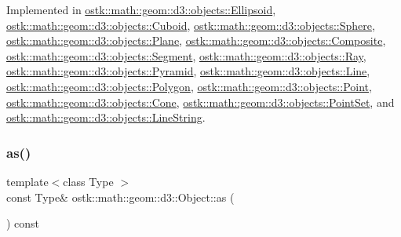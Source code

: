 Implemented in \hyperlink{classostk_1_1math_1_1geom_1_1d3_1_1objects_1_1_ellipsoid_aa7c60b942f6b1fa3a513bc3b549ab9e6}{ostk\+::math\+::geom\+::d3\+::objects\+::\+Ellipsoid}, \hyperlink{classostk_1_1math_1_1geom_1_1d3_1_1objects_1_1_cuboid_aaa90106ccf8120f854bdcf0f824e5610}{ostk\+::math\+::geom\+::d3\+::objects\+::\+Cuboid}, \hyperlink{classostk_1_1math_1_1geom_1_1d3_1_1objects_1_1_sphere_a421357bf4058e68e0aa636f606c6b249}{ostk\+::math\+::geom\+::d3\+::objects\+::\+Sphere}, \hyperlink{classostk_1_1math_1_1geom_1_1d3_1_1objects_1_1_plane_a4d96743e35df811f8c725561d353e245}{ostk\+::math\+::geom\+::d3\+::objects\+::\+Plane}, \hyperlink{classostk_1_1math_1_1geom_1_1d3_1_1objects_1_1_composite_a2d99d6b4096c2f5ba3175f886e2e2c7d}{ostk\+::math\+::geom\+::d3\+::objects\+::\+Composite}, \hyperlink{classostk_1_1math_1_1geom_1_1d3_1_1objects_1_1_segment_a5d2aba754d42c89224c7579944de9c4f}{ostk\+::math\+::geom\+::d3\+::objects\+::\+Segment}, \hyperlink{classostk_1_1math_1_1geom_1_1d3_1_1objects_1_1_ray_abdbc52aa6745f9d9601a8138a519d828}{ostk\+::math\+::geom\+::d3\+::objects\+::\+Ray}, \hyperlink{classostk_1_1math_1_1geom_1_1d3_1_1objects_1_1_pyramid_ab4f31049019c0ea4b87931adf4ba7c5d}{ostk\+::math\+::geom\+::d3\+::objects\+::\+Pyramid}, \hyperlink{classostk_1_1math_1_1geom_1_1d3_1_1objects_1_1_line_ab12eb788b966601d6d09f75196a30d6f}{ostk\+::math\+::geom\+::d3\+::objects\+::\+Line}, \hyperlink{classostk_1_1math_1_1geom_1_1d3_1_1objects_1_1_polygon_abf60fe8602485822f8f07c01f6980cf5}{ostk\+::math\+::geom\+::d3\+::objects\+::\+Polygon}, \hyperlink{classostk_1_1math_1_1geom_1_1d3_1_1objects_1_1_point_a0b79a5726ac04f814b8a5b737daf0028}{ostk\+::math\+::geom\+::d3\+::objects\+::\+Point}, \hyperlink{classostk_1_1math_1_1geom_1_1d3_1_1objects_1_1_cone_a9b783e16344d65dfba68c63d1adca3e1}{ostk\+::math\+::geom\+::d3\+::objects\+::\+Cone}, \hyperlink{classostk_1_1math_1_1geom_1_1d3_1_1objects_1_1_point_set_af03e071aa9d7a364a0c76f563b65a57e}{ostk\+::math\+::geom\+::d3\+::objects\+::\+Point\+Set}, and \hyperlink{classostk_1_1math_1_1geom_1_1d3_1_1objects_1_1_line_string_a8d1b47e4f9e314a5fc7df353c808dbc2}{ostk\+::math\+::geom\+::d3\+::objects\+::\+Line\+String}.

\mbox{\label{classostk_1_1math_1_1geom_1_1d3_1_1_object_ad921120c3bf1176035258fad0f654137}} 
\subsubsection{\texorpdfstring{as()}{as()}}
{\footnotesize\ttfamily template$<$class Type $>$ \\
const Type\& ostk\+::math\+::geom\+::d3\+::\+Object\+::as (\begin{DoxyParamCaption}{ }\end{DoxyParamCaption}) const\hspace{0.3cm}{\ttfamily [inline]}}




